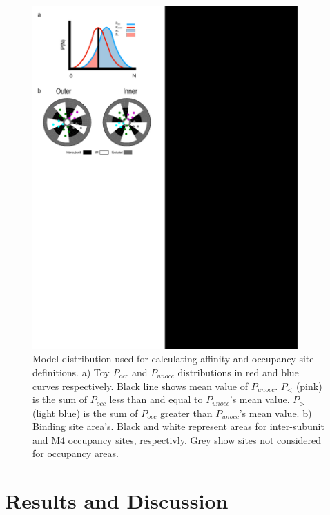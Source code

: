 \documentclass[preprint,3p,9pt,times,onecolumn]{elsarticle}
\begin{document}
\begin{figure}[!h]
	\center
	\includegraphics[width=4in]{PartialBIndingToy.pdf}

	\caption{ Model distribution used for calculating affinity and occupancy site definitions. a)  Toy $P_{occ}$ and $P_{unocc}$ distributions in red and blue curves respectively. Black line shows mean value of $P_{unocc}$. $P_<$ (pink) is the sum of  $P_{occ}$ less than and equal to  $P_{unocc}$'s mean value. $P_>$ (light blue) is the sum of  $P_{occ}$ greater than $P_{unocc}$'s mean value. b) Binding site area's. Black and white represent areas for inter-subunit and M4 occupancy sites, respectivly. Grey show sites not considered for occupancy areas.}
	\label{fig:PBT}
\end{figure}



\section{Results and Discussion}
\label{res}
\end{document}
